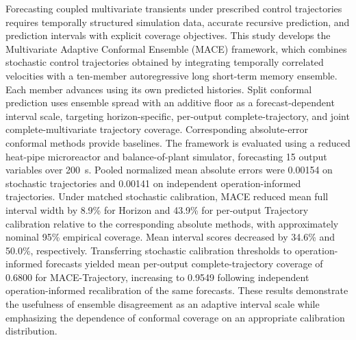 % 

Forecasting coupled multivariate transients under prescribed control trajectories requires temporally structured simulation data, accurate recursive prediction, and prediction intervals with explicit coverage objectives. This study develops the Multivariate Adaptive Conformal Ensemble (MACE) framework, which combines stochastic control trajectories obtained by integrating temporally correlated velocities with a ten-member autoregressive long short-term memory ensemble. Each member advances using its own predicted histories. Split conformal prediction uses ensemble spread with an additive floor as a forecast-dependent interval scale, targeting horizon-specific, per-output complete-trajectory, and joint complete-multivariate trajectory coverage. Corresponding absolute-error conformal methods provide baselines. The framework is evaluated using a reduced heat-pipe microreactor and balance-of-plant simulator, forecasting 15 output variables over 200~s. Pooled normalized mean absolute errors were 0.00154 on stochastic trajectories and 0.00141 on independent operation-informed trajectories. Under matched stochastic calibration, MACE reduced mean full interval width by 8.9\% for Horizon and 43.9\% for per-output Trajectory calibration relative to the corresponding absolute methods, with approximately nominal 95\% empirical coverage. Mean interval scores decreased by 34.6\% and 50.0\%, respectively. Transferring stochastic calibration thresholds to operation-informed forecasts yielded mean per-output complete-trajectory coverage of 0.6800 for MACE-Trajectory, increasing to 0.9549 following independent operation-informed recalibration of the same forecasts. These results demonstrate the usefulness of ensemble disagreement as an adaptive interval scale while emphasizing the dependence of conformal coverage on an appropriate calibration distribution.
